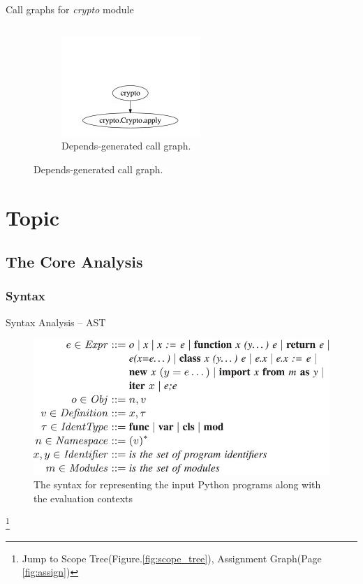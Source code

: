 \documentclass[9pt, xcolor=table]{beamer}
\begin{document}
\begin{frame}{Call graphs for \textit{crypto} module}
\begin{figure}[htp]
\begin{columns}[totalwidth=\linewidth]
			\begin{column}{0.3\columnwidth}
				\begin{subfigure}
					\centering
					\includegraphics[height=0.33\paperheight]{call_graph_compare_c.jpg}
					\caption{Depends-generated call graph.}
					\label{subfig:call_graph_compare_c}
				\end{subfigure}
			\end{column}
		\end{columns}	
	\label{fig:call_graph_compare}	
	\end{figure}	
\end{frame}
%
\section{Topic}
%
\subsection{The Core Analysis}
%

%
\subsubsection{Syntax}
\begin{frame}{Syntax Analysis -- AST}
	\begin{figure}
		\centering
		\includegraphics[height=0.5\paperheight]{AST.png}
		\caption{The syntax for representing the input Python programs along with the evaluation contexts}
		\label{fig:ast}
	\end{figure}		
	\footnote{Jump to Scope Tree(Figure.\ref{fig:scope_tree}), Assignment Graph(Page \ref{fig:assign})}
\end{frame}
\end{document}
